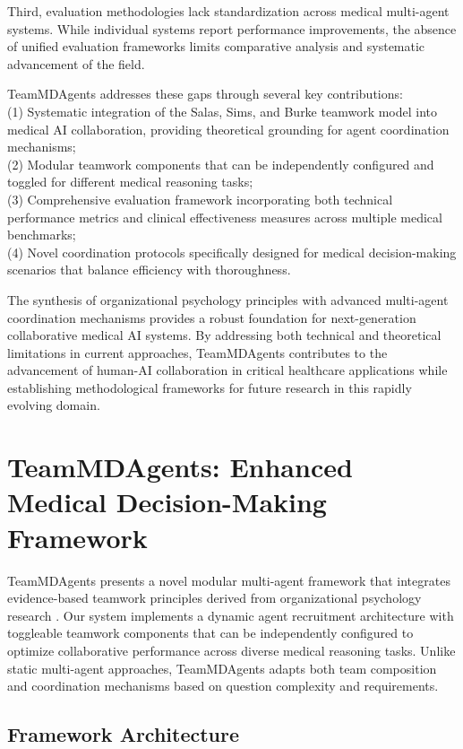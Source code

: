 \documentclass[letterpaper]{article} %
\begin{document}
Third, evaluation methodologies lack standardization across medical multi-agent systems. While individual systems report performance improvements, the absence of unified evaluation frameworks limits comparative analysis and systematic advancement of the field.

TeamMDAgents addresses these gaps through several key contributions:\\
(1) Systematic integration of the Salas, Sims, and Burke teamwork model into medical AI collaboration, providing theoretical grounding for agent coordination mechanisms;\\
(2) Modular teamwork components that can be independently configured and toggled for different medical reasoning tasks; \\(3) Comprehensive evaluation framework incorporating both technical performance metrics and clinical effectiveness measures across multiple medical benchmarks; \\
(4) Novel coordination protocols specifically designed for medical decision-making scenarios that balance efficiency with thoroughness.

The synthesis of organizational psychology principles with advanced multi-agent coordination mechanisms provides a robust foundation for next-generation collaborative medical AI systems. By addressing both technical and theoretical limitations in current approaches, TeamMDAgents contributes to the advancement of human-AI collaboration in critical healthcare applications while establishing methodological frameworks for future research in this rapidly evolving domain.

\section{TeamMDAgents: Enhanced Medical Decision-Making Framework}

TeamMDAgents presents a novel modular multi-agent framework that integrates evidence-based teamwork principles derived from organizational psychology research \cite{salas2005big}. Our system implements a dynamic agent recruitment architecture with toggleable teamwork components that can be independently configured to optimize collaborative performance across diverse medical reasoning tasks. Unlike static multi-agent approaches, TeamMDAgents adapts both team composition and coordination mechanisms based on question complexity and requirements.

\subsection{Framework Architecture}
\end{document}
